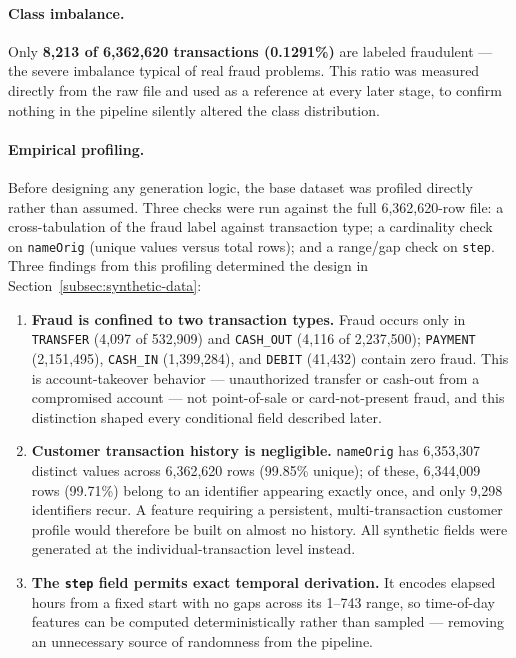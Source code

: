 \paragraph{Class imbalance.} Only \textbf{8,213 of 6,362,620 transactions (0.1291\%)} are labeled fraudulent --- the severe imbalance typical of real fraud problems. This ratio was measured directly from the raw file and used as a reference at every later stage, to confirm nothing in the pipeline silently altered the class distribution.

\paragraph{Empirical profiling.} Before designing any generation logic, the base dataset was profiled directly rather than assumed. Three checks were run against the full 6,362,620-row file: a cross-tabulation of the fraud label against transaction type; a cardinality check on \texttt{nameOrig} (unique values versus total rows); and a range/gap check on \texttt{step}. Three findings from this profiling determined the design in Section~\ref{subsec:synthetic-data}:

\begin{enumerate}
    \item \textbf{Fraud is confined to two transaction types.} Fraud occurs only in \texttt{TRANSFER} (4,097 of 532,909) and \texttt{CASH\_OUT} (4,116 of 2,237,500); \texttt{PAYMENT} (2,151,495), \texttt{CASH\_IN} (1,399,284), and \texttt{DEBIT} (41,432) contain zero fraud. This is account-takeover behavior --- unauthorized transfer or cash-out from a compromised account --- not point-of-sale or card-not-present fraud, and this distinction shaped every conditional field described later.
    \item \textbf{Customer transaction history is negligible.} \texttt{nameOrig} has 6,353,307 distinct values across 6,362,620 rows (99.85\% unique); of these, 6,344,009 rows (99.71\%) belong to an identifier appearing exactly once, and only 9,298 identifiers recur. A feature requiring a persistent, multi-transaction customer profile would therefore be built on almost no history. All synthetic fields were generated at the individual-transaction level instead.
    \item \textbf{The \texttt{step} field permits exact temporal derivation.} It encodes elapsed hours from a fixed start with no gaps across its 1--743 range, so time-of-day features can be computed deterministically rather than sampled --- removing an unnecessary source of randomness from the pipeline.
\end{enumerate}

